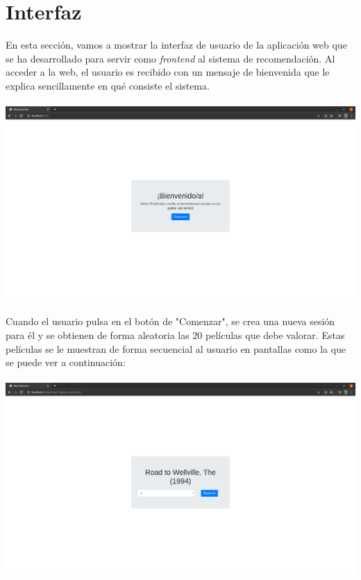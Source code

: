 \section{Interfaz}

En esta sección, vamos a mostrar la interfaz de usuario de la aplicación web que se ha desarrollado para servir como \textit{frontend} al sistema de recomendación. Al acceder a la web, el usuario es recibido con un mensaje de bienvenida que le explica sencillamente en qué consiste el sistema.
\\\\
\includegraphics[width=\textwidth,height=\textheight,keepaspectratio]{images/index.png}
\\\\
Cuando el usuario pulsa en el botón de "Comenzar", se crea una nueva sesión para él y se obtienen de forma aleatoria las 20 películas que debe valorar. Estas películas se le muestran de forma secuencial al usuario en pantallas como la que se puede ver a continuación:
\\\\
\includegraphics[width=\textwidth,height=\textheight,keepaspectratio]{images/rating.png}
